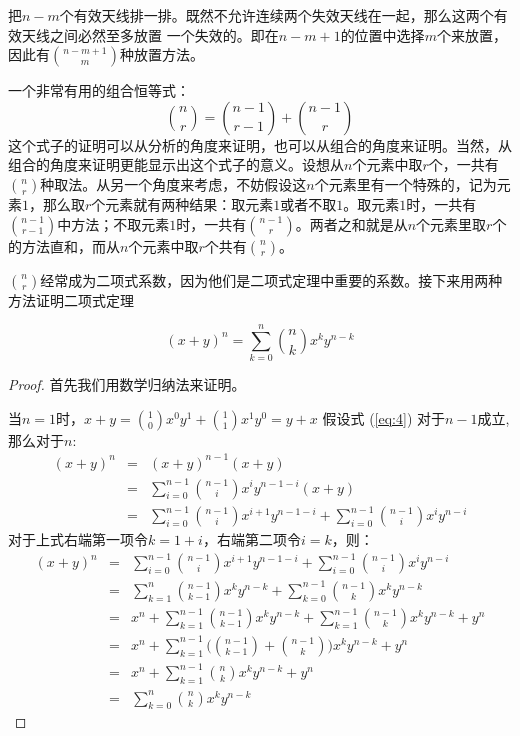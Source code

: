 \documentclass[10pt,a4paper,UTF8]{article}
\begin{document}
\begin{answer}
把\(n-m\)个有效天线排一排。既然不允许连续两个失效天线在一起，那么这两个有效天线之间必然至多放置 一个失效的。即在\(n-m+1\)的位置中选择\(m\)个来放置，因此有\(\binom{n-m+1}{m}\)种放置方法。
\end{answer}

一个非常有用的组合恒等式：
\begin{equation}
\label{eq:3}
\binom{n}{r} = \binom{n-1}{r-1} + \binom{n-1}{r}
\end{equation}
这个式子的证明可以从分析的角度来证明，也可以从组合的角度来证明。当然，从组合的角度来证明更能显示出这个式子的意义。设想从\(n\)个元素中取\(r\)个，一共有\(\binom{n}{r}\)种取法。从另一个角度来考虑，不妨假设这\(n\)个元素里有一个特殊的，记为元素\(1\)，那么取\(r\)个元素就有两种结果：取元素\(1\)或者不取\(1\)。取元素\(1\)时，一共有\(\binom{n-1}{r-1}\)中方法；不取元素\(1\)时，一共有\(\binom{n-1}{r}\)。两者之和就是从\(n\)个元素里取\(r\)个的方法直和，而从\(n\)个元素中取\(r\)个共有\(\binom{n}{r}\)。

\(\binom{n}{r}\)经常成为二项式系数，因为他们是二项式定理中重要的系数。接下来用两种方法证明二项式定理

\begin{theorem}
\begin{equation}
\label{eq:4}
(x+y)^{n} = \sum_{k=0}^{n}\binom{n}{k}x^{k}y^{n-k}
\end{equation}
\end{theorem}
\begin{proof}
首先我们用数学归纳法来证明。

当\(n=1\)时，\(x+y = \binom{1}{0}x^{0}y^{1} + \binom{1}{1}x^{1}y^{0} = y+x\)
假设式 (\ref{eq:4}) 对于\(n-1\)成立,那么对于\(n\):
\begin{eqnarray}
\label{eq:5}
(x+y)^{n}&=& (x+y)^{n-1}(x+y) \\
&=& \sum_{i=0}^{n-1}\binom{n-1}{i}x^{i}y^{n-1-i}(x+y) \\
&=& \sum_{i=0}^{n-1}\binom{n-1}{i}x^{i+1}y^{n-1-i}  + \sum_{i=0}^{n-1}\binom{n-1}{i}x^{i}y^{n-i}
\end{eqnarray}
对于上式右端第一项令\(k = 1 + i\)，右端第二项令\(i=k\)，则：
\begin{eqnarray}
\label{eq:6}
(x+y)^{n}&=& \sum_{i=0}^{n-1}\binom{n-1}{i}x^{i+1}y^{n-1-i}  + \sum_{i=0}^{n-1}\binom{n-1}{i}x^{i}y^{n-i}  \\
&=& \sum_{k=1}^{n} \binom{n-1}{k-1}x^{k}y^{n-k} + \sum_{k=0}^{n-1}\binom{n-1}{k}x^{k}y^{n-k} \\
&=& x^{n} + \sum_{k=1}^{n-1} \binom{n-1}{k-1}x^{k}y^{n-k} + \sum_{k=1}^{n-1}\binom{n-1}{k}x^{k}y^{n-k} + y^{n} \\
&=& x^{n} + \sum_{k=1}^{n-1} \bigg( \binom{n-1}{k-1} + \binom{n-1}{k} \bigg)x^{k}y^{n-k} + y^{n} \\
&=& x^{n} + \sum_{k=1}^{n-1} \binom{n}{k} x^{k}y^{n-k} + y^{n} \\
&=& \sum_{k=0}^{n} \binom{n}{k}x^{k}y^{n-k}
\end{eqnarray}
\end{proof}
\end{document}
